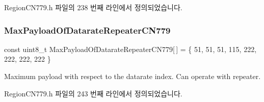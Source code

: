 Region\+C\+N779.\+h 파일의 238 번째 라인에서 정의되었습니다.

\mbox{\label{group___r_e_g_i_o_n_c_n779_ga8ccff08913b601d267589caf346a585b}} 
\subsubsection{\texorpdfstring{Max\+Payload\+Of\+Datarate\+Repeater\+C\+N779}{MaxPayloadOfDatarateRepeaterCN779}}
{\footnotesize\ttfamily const uint8\+\_\+t Max\+Payload\+Of\+Datarate\+Repeater\+C\+N779\mbox{[}$\,$\mbox{]} = \{ 51, 51, 51, 115, 222, 222, 222, 222 \}\hspace{0.3cm}{\ttfamily [static]}}

Maximum payload with respect to the datarate index. Can operate with repeater. 

Region\+C\+N779.\+h 파일의 243 번째 라인에서 정의되었습니다.

